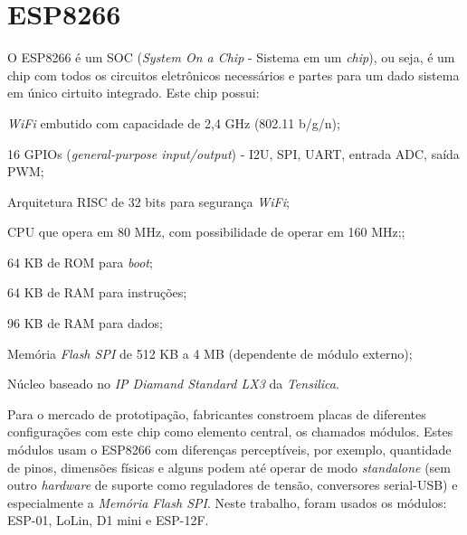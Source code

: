 \section{ESP8266}

O ESP8266 é um SOC (\emph{System On a Chip} -  Sistema em um \emph{chip}), ou
seja, é um chip com todos os circuitos eletrônicos necessários e partes para um
dado sistema em único cirtuito integrado. Este chip possui:

\begin{alineas}

	\item \emph{WiFi} embutido com capacidade de 2,4 GHz (802.11 b/g/n);

	\item 16 GPIOs (\emph{general-purpose input/output}) - I2U, SPI, UART,
entrada ADC, saída PWM;

	\item Arquitetura RISC de 32 bits para segurança \emph{WiFi};

	\item CPU que opera em  80 MHz, com possibilidade de operar em 160 MHz;;

	\item 64 KB de ROM para \emph{boot};

	\item 64 KB de RAM para instruções;

	\item 96 KB de RAM para dados;

	\item  Memória \emph{Flash SPI} de 512 KB a 4 MB (dependente de módulo externo);

	\item Núcleo baseado no \emph{IP Diamand Standard LX3} da \emph{Tensilica}.

\end{alineas}

Para o mercado de prototipação, fabricantes constroem placas de diferentes
configurações com este chip como elemento central, os chamados módulos. Estes
módulos usam o ESP8266 com diferenças perceptíveis, por exemplo, quantidade de
pinos, dimensões físicas e alguns podem até operar de modo \emph{standalone}
(sem outro \emph{hardware} de suporte como reguladores de tensão, conversores
serial-USB) e especialmente a \emph{Memória Flash SPI}. Neste trabalho, foram
usados os módulos: ESP-01, LoLin, D1 mini e ESP-12F.

